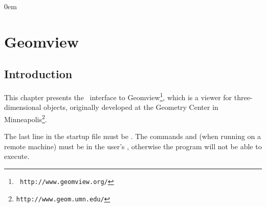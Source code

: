 \newcommand{\Section}[1]{Section~{\protect\ref{#1}}}
\newcommand{\Chapter}[1]{Chapter~{\protect\ref{#1}}}
\newcommand{\new}[1]{\marginpar{\sf #1}}

\newcommand{\what}{\mbox{?\hspace*{2cm}?}}


\parindent0em
\setlength{\parskip}{1ex minus 0.9ex}
\sloppy

\newcommand{\note}[1]{{\bf NOTE: #1}}

\chapter{Geomview} \label{ChapterGeomview}


\section{Introduction}

This chapter presents the \cgal\ interface to Geomview\footnote{\tt
http://www.geomview.org/}, which is a
viewer for three-dimensional objects, originally developed at the Geometry
Center in Minneapolis\footnote{\tt http://www.geom.umn.edu/}.

 The last line in the startup file 
must be . The commands  and 
(when running on a remote machine) must be in the user's , otherwise
the program will not be able to execute.


